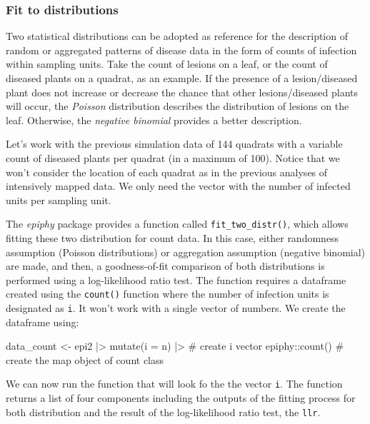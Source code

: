 \documentclass[
  letterpaper,
  DIV=11,
  numbers=noendperiod]{scrreprt}
\newenvironment{Shaded}{\begin{snugshade}}{\end{snugshade}}
\newcommand{\AttributeTok}[1]{\textcolor[rgb]{0.40,0.45,0.13}{#1}}
\newcommand{\CommentTok}[1]{\textcolor[rgb]{0.37,0.37,0.37}{#1}}
\newcommand{\FunctionTok}[1]{\textcolor[rgb]{0.28,0.35,0.67}{#1}}
\newcommand{\NormalTok}[1]{\textcolor[rgb]{0.00,0.23,0.31}{#1}}
\newcommand{\OtherTok}[1]{\textcolor[rgb]{0.00,0.23,0.31}{#1}}
\newcommand{\SpecialCharTok}[1]{\textcolor[rgb]{0.37,0.37,0.37}{#1}}
\begin{document}
\hypertarget{fit-to-distributions}{%
\subsubsection{Fit to distributions}\label{fit-to-distributions}}

Two statistical distributions can be adopted as reference for the
description of random or aggregated patterns of disease data in the form
of counts of infection within sampling units. Take the count of lesions
on a leaf, or the count of diseased plants on a quadrat, as an example.
If the presence of a lesion/diseased plant does not increase or decrease
the chance that other lesions/diseased plants will occur, the
\emph{Poisson} distribution describes the distribution of lesions on the
leaf. Otherwise, the \emph{negative binomial} provides a better
description.

Let's work with the previous simulation data of 144 quadrats with a
variable count of diseased plants per quadrat (in a maximum of 100).
Notice that we won't consider the location of each quadrat as in the
previous analyses of intensively mapped data. We only need the vector
with the number of infected units per sampling unit.

The \emph{epiphy} package provides a function called
\texttt{fit\_two\_distr()}, which allows fitting these two distribution
for count data. In this case, either randomness assumption (Poisson
distributions) or aggregation assumption (negative binomial) are made,
and then, a goodness-of-fit comparison of both distributions is
performed using a log-likelihood ratio test. The function requires a
dataframe created using the \texttt{count()} function where the number
of infection units is designated as \texttt{i}. It won't work with a
single vector of numbers. We create the dataframe using:

\begin{Shaded}
\begin{Highlighting}[]
\NormalTok{data\_count }\OtherTok{\textless{}{-}}\NormalTok{ epi2 }\SpecialCharTok{|\textgreater{}} 
  \FunctionTok{mutate}\NormalTok{(}\AttributeTok{i =}\NormalTok{ n) }\SpecialCharTok{|\textgreater{}}  \CommentTok{\# create i vector}
\NormalTok{  epiphy}\SpecialCharTok{::}\FunctionTok{count}\NormalTok{()   }\CommentTok{\# create the map object of count class}
\end{Highlighting}
\end{Shaded}

We can now run the function that will look fo the the vector \texttt{i}.
The function returns a list of four components including the outputs of
the fitting process for both distribution and the result of the
log-likelihood ratio test, the \texttt{llr}.
\end{document}

